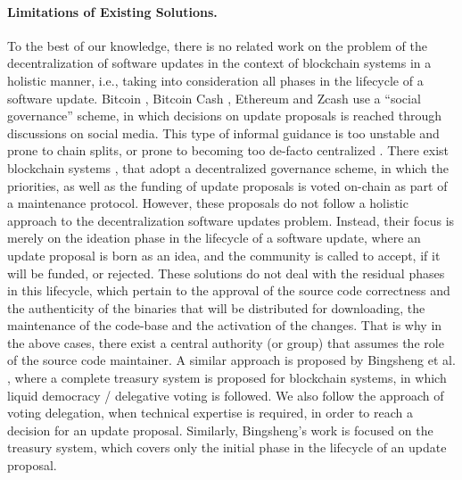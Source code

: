 \paragraph{Limitations of Existing Solutions.}
To the best of our knowledge, there is no related work on the problem of the decentralization of software updates in the context of blockchain systems in a holistic manner, i.e., taking into consideration all phases in the lifecycle of a software update. 
Bitcoin \cite{bitcoin}, Bitcoin Cash , Ethereum \cite{ethereum} and Zcash  use a \enquote{social governance} scheme, in which decisions on update proposals is reached through discussions on social media. This type of informal guidance is  too unstable and prone to chain splits, or prone to becoming too de-facto centralized \cite{buterin_on_gov}. There exist blockchain systems \cite{dash}, \cite{decred} that adopt a decentralized governance scheme, in which the priorities, as well as the funding of update proposals is voted on-chain as part of a maintenance protocol. However, these proposals do not follow a holistic approach to the decentralization software updates problem. Instead, their focus is merely on the ideation phase in the lifecycle of a software update, where an update proposal is born as an idea, and the community is called to accept, if it will be funded, or rejected. These solutions do not deal with the residual phases in this lifecycle, which pertain to the approval of the source code correctness and the authenticity of the binaries that will be distributed for downloading, the maintenance of the code-base and the activation of the changes. That is why in the above cases, there exist a central authority (or group) that assumes the role of the source code maintainer. A similar approach is proposed by Bingsheng et al. \cite{cryptoeprint:2018:435}, where a complete treasury system is proposed for blockchain systems, in which liquid democracy / delegative voting is followed. We also follow the approach of voting delegation, when technical expertise is required, in order to reach a decision for an update proposal. Similarly, Bingsheng's work is focused on the treasury system, which covers only the initial phase in the lifecycle of an update proposal.


%
